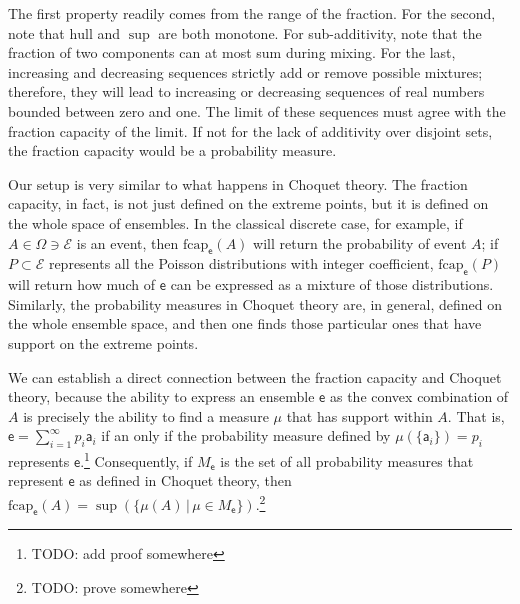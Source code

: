\documentclass[10pt,twocolumn, nofootinbib]{revtex4-2}
\newcommand\hull{\mathrm{hull}}
\newcommand\frcap{\mathrm{fcap}}
\newcommand{\ens}[1][e] {\mathsf{#1}} %
\newcommand{\Ens}[1][E] {\mathcal{#1}} %
\begin{document}
The first property readily comes from the range of the fraction. For the second, note that $\hull$ and $\sup$ are both monotone. For sub-additivity, note that the fraction of two components can at most sum during mixing. For the last, increasing and decreasing sequences strictly add or remove possible mixtures; therefore, they will lead to increasing or decreasing sequences of real numbers bounded between zero and one. The limit of these sequences must agree with the fraction capacity of the limit. If not for the lack of additivity over disjoint sets, the fraction capacity would be a probability measure.

Our setup is very similar to what happens in Choquet theory. The fraction capacity, in fact, is not just defined on the extreme points, but it is defined on the whole space of ensembles. In the classical discrete case, for example, if $A \in \Omega \ni \Ens$ is an event, then $\frcap_{\ens}(A)$ will return the probability of event $A$; if $P \subset \Ens$ represents all the Poisson distributions with integer coefficient, $\frcap_{\ens}(P)$ will return how much of $\ens$ can be expressed as a mixture of those distributions. Similarly, the probability measures in Choquet theory are, in general, defined on the whole ensemble space, and then one finds those particular ones that have support on the extreme points.

We can establish a direct connection between the fraction capacity and Choquet theory, because the ability to express an ensemble $\ens$ as the convex combination of $A$ is precisely the ability to find a measure $\mu$ that has support within $A$. That is, $\ens = \sum_{i=1}^{\infty} p_i \ens[a]_i$ if an only if the probability measure defined by $\mu(\{\ens[a]_i\}) = p_i$ represents $\ens$.\footnote{TODO: add proof somewhere} Consequently, if $M_{\ens}$ is the set of all probability measures that represent $\ens$ as defined in Choquet theory, then $\frcap_{\ens}(A) = \sup(\{\mu(A) \, | \, \mu \in M_{\ens}\})$.\footnote{TODO: prove somewhere}
\end{document}
